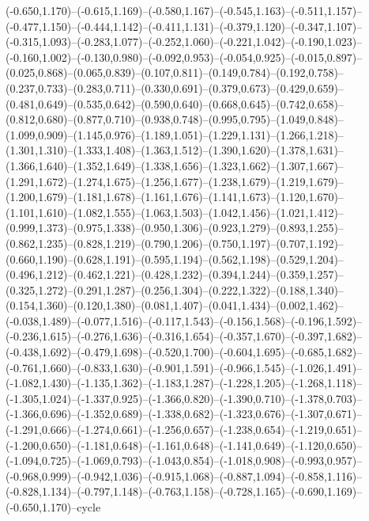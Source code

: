 \documentclass[10pt]{article}
\begin{document}
(-0.650,1.170)--(-0.615,1.169)--(-0.580,1.167)--(-0.545,1.163)--(-0.511,1.157)--(-0.477,1.150)--(-0.444,1.142)--(-0.411,1.131)--(-0.379,1.120)--(-0.347,1.107)--(-0.315,1.093)--(-0.283,1.077)--(-0.252,1.060)--(-0.221,1.042)--(-0.190,1.023)--(-0.160,1.002)--(-0.130,0.980)--(-0.092,0.953)--(-0.054,0.925)--(-0.015,0.897)--(0.025,0.868)--(0.065,0.839)--(0.107,0.811)--(0.149,0.784)--(0.192,0.758)--(0.237,0.733)--(0.283,0.711)--(0.330,0.691)--(0.379,0.673)--(0.429,0.659)--(0.481,0.649)--(0.535,0.642)--(0.590,0.640)--(0.668,0.645)--(0.742,0.658)--(0.812,0.680)--(0.877,0.710)--(0.938,0.748)--(0.995,0.795)--(1.049,0.848)--(1.099,0.909)--(1.145,0.976)--(1.189,1.051)--(1.229,1.131)--(1.266,1.218)--(1.301,1.310)--(1.333,1.408)--(1.363,1.512)--(1.390,1.620)--(1.378,1.631)--(1.366,1.640)--(1.352,1.649)--(1.338,1.656)--(1.323,1.662)--(1.307,1.667)--(1.291,1.672)--(1.274,1.675)--(1.256,1.677)--(1.238,1.679)--(1.219,1.679)--(1.200,1.679)--(1.181,1.678)--(1.161,1.676)--(1.141,1.673)--(1.120,1.670)--(1.101,1.610)--(1.082,1.555)--(1.063,1.503)--(1.042,1.456)--(1.021,1.412)--(0.999,1.373)--(0.975,1.338)--(0.950,1.306)--(0.923,1.279)--(0.893,1.255)--(0.862,1.235)--(0.828,1.219)--(0.790,1.206)--(0.750,1.197)--(0.707,1.192)--(0.660,1.190)--(0.628,1.191)--(0.595,1.194)--(0.562,1.198)--(0.529,1.204)--(0.496,1.212)--(0.462,1.221)--(0.428,1.232)--(0.394,1.244)--(0.359,1.257)--(0.325,1.272)--(0.291,1.287)--(0.256,1.304)--(0.222,1.322)--(0.188,1.340)--(0.154,1.360)--(0.120,1.380)--(0.081,1.407)--(0.041,1.434)--(0.002,1.462)--(-0.038,1.489)--(-0.077,1.516)--(-0.117,1.543)--(-0.156,1.568)--(-0.196,1.592)--(-0.236,1.615)--(-0.276,1.636)--(-0.316,1.654)--(-0.357,1.670)--(-0.397,1.682)--(-0.438,1.692)--(-0.479,1.698)--(-0.520,1.700)--(-0.604,1.695)--(-0.685,1.682)--(-0.761,1.660)--(-0.833,1.630)--(-0.901,1.591)--(-0.966,1.545)--(-1.026,1.491)--(-1.082,1.430)--(-1.135,1.362)--(-1.183,1.287)--(-1.228,1.205)--(-1.268,1.118)--(-1.305,1.024)--(-1.337,0.925)--(-1.366,0.820)--(-1.390,0.710)--(-1.378,0.703)--(-1.366,0.696)--(-1.352,0.689)--(-1.338,0.682)--(-1.323,0.676)--(-1.307,0.671)--(-1.291,0.666)--(-1.274,0.661)--(-1.256,0.657)--(-1.238,0.654)--(-1.219,0.651)--(-1.200,0.650)--(-1.181,0.648)--(-1.161,0.648)--(-1.141,0.649)--(-1.120,0.650)--(-1.094,0.725)--(-1.069,0.793)--(-1.043,0.854)--(-1.018,0.908)--(-0.993,0.957)--(-0.968,0.999)--(-0.942,1.036)--(-0.915,1.068)--(-0.887,1.094)--(-0.858,1.116)--(-0.828,1.134)--(-0.797,1.148)--(-0.763,1.158)--(-0.728,1.165)--(-0.690,1.169)--(-0.650,1.170)--cycle 
\end{document}
